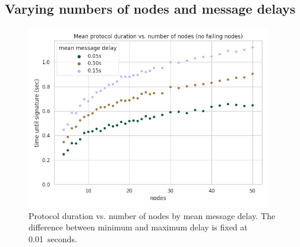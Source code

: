 \subsection*{Varying numbers of nodes and message delays}

\begin{figure}[H]
    \centering
    \includegraphics[width=0.95\textwidth]{figures/5/round_wall_sum_by_num_nodes.png}
    \captionsetup{labelformat=empty}
    \caption{Protocol duration vs. number of nodes by mean message delay. The difference between minimum and maximum delay is fixed at 0.01~seconds.}
\end{figure}

